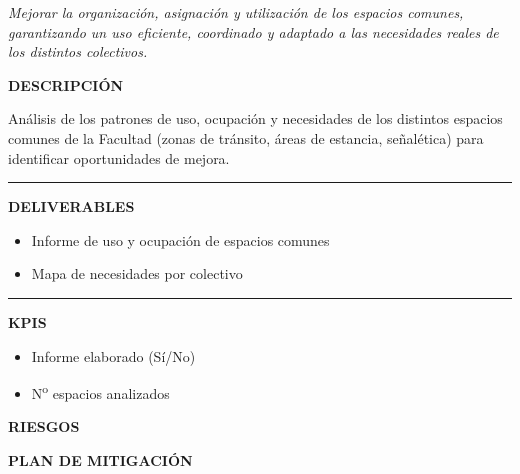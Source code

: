 \documentclass[11pt,a4paper]{scrreprt}
\newcommand{\fieldlabel}[1]{%
  {\footnotesize\sffamily\bfseries\color{mutedcolor}\MakeUppercase{#1}}\par\nopagebreak[4]
}
\newcommand{\fieldsep}{\vspace{3pt}\noindent\textcolor{bordercolor}{\rule{\linewidth}{0.4pt}}\vspace{3pt}\par}
\begin{document}
\newpage
{}
{\small\color{mutedcolor}\itshape Mejorar la organización, asignación y utilización de los espacios comunes, garantizando un uso eficiente, coordinado y adaptado a las necesidades reales de los distintos colectivos.}\par\vspace{6pt}

\begin{tcolorbox}[pabox={espcolor}{PA7.1 \enspace\textbullet\enspace Diagnóstico y análisis de uso de los espacios comunes}]

\fieldlabel{Descripci\'on}
{\small Análisis de los patrones de uso, ocupación y necesidades de los distintos espacios comunes de la Facultad (zonas de tránsito, áreas de estancia, señalética) para identificar oportunidades de mejora.}\par
\fieldsep
\fieldlabel{Deliverables}
{\small \begin{itemize}[noitemsep,topsep=2pt]
\item Informe de uso y ocupación de espacios comunes
\item Mapa de necesidades por colectivo
\end{itemize}}\par
\fieldsep
\fieldlabel{KPIs}
{\small \begin{itemize}[noitemsep,topsep=2pt]
\item Informe elaborado (Sí/No)
\item N\textsuperscript{o} espacios analizados
\end{itemize}}\par
\end{tcolorbox}
\begin{tcolorbox}[riskbox]
{\footnotesize\sffamily\bfseries\color{red!50!black} RIESGOS}\par{}
\end{tcolorbox}
\begin{tcolorbox}[mitbox]
{\footnotesize\sffamily\bfseries\color{green!40!black} PLAN DE MITIGACI\'ON}\par{}
\end{tcolorbox}
\vspace{8pt}
\end{document}
